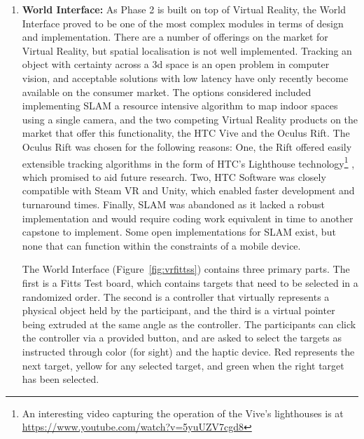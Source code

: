 \documentclass[
12pt, %
oneside, %
english, %
doublespacing, %
headsepline, %
]{MastersDoctoralThesis} %
\begin{document}
\begin{enumerate}
	\item \textbf{World Interface: } As Phase 2 is built on top of Virtual Reality, the World Interface proved to be one of the most complex modules in terms of design and implementation. There are a number of offerings on the market for Virtual Reality, but spatial localisation is not well implemented. Tracking an object with certainty across a 3d space is an open problem in computer vision, and acceptable solutions with low latency have only recently become available on the consumer market. The options considered included implementing SLAM \parencite{noauthor_simultaneous_2017} a resource intensive algorithm to map indoor spaces using a single camera, and the two competing Virtual Reality products on the market that offer this functionality, the HTC Vive and the Oculus Rift. The Oculus Rift was chosen for the following reasons: One, the Rift offered easily extensible tracking algorithms in the form of HTC's Lighthouse technology\footnote{An interesting video capturing the operation of the Vive's lighthouses is at \href{https://www.youtube.com/watch?v=5yuUZV7cgd8}{https://www.youtube.com/watch?v=5yuUZV7cgd8}} \parencite{niehorster_accuracy_2017}, which promised to aid future research. Two, HTC Software was closely compatible with Steam VR and Unity, which enabled faster development and turnaround times. Finally, SLAM was abandoned as it lacked a robust implementation and would require coding work equivalent in time to another capstone to implement. Some open implementations \parencite{yan_contribute_2017}
	\parencite{aivijay_lsd_slam_noros_2017} for SLAM exist, but none that can function within the constraints of a mobile device.

	The World Interface (Figure~\ref{fig:vrfittss}) contains three primary parts. The first is a Fitts Test board, which contains targets that need to be selected in a randomized order. The second is a controller that virtually represents a physical object held by the participant, and the third is a virtual pointer being extruded at the same angle as the controller. The participants can click the controller via a provided button, and are asked to select the targets as instructed through color (for sight) and the haptic device. Red represents the next target, yellow for any selected target, and green when the right target has been selected.


\end{enumerate}
\end{document}

